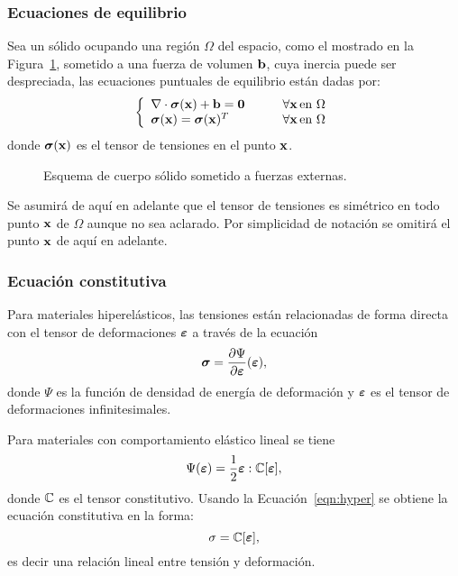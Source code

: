 \subsubsection*{Ecuaciones de equilibrio}

Sea un sólido ocupando una región $\Omega$ del espacio, como el mostrado en la Figura~\ref{fig:diagrama_solido}, sometido a una fuerza de volumen ${\bf b}$, cuya inercia puede ser despreciada, las ecuaciones puntuales de equilibrio están dadas por:
%
\begin{equation}\label{eqn:equil}
\left\{
\begin{array}{lr}
  \nabla \cdot \boldsymbol{\sigma}({\bf x}) + {\bf b} = \boldsymbol{0} \qquad &\forall {\bf x} \, \text{en } \Omega\\
  \boldsymbol{\sigma}({\bf x}) = \boldsymbol{\sigma}({\bf x})^T \qquad  &\forall {\bf x}\, \text{en } \Omega
\end{array}
\right.
\end{equation}
%
donde $\boldsymbol{\sigma}({\bf x})$ es el tensor de tensiones en el punto ${\bf x}$. %
%

\begin{figure}[htb]
\centering
  \def\svgwidth{0.4\textwidth}
  
\caption{Esquema de cuerpo sólido sometido a fuerzas externas.}
\label{fig:diagrama_solido}
\end{figure}

%
Se asumirá de aquí en adelante que el tensor de tensiones es simétrico en todo punto ${\bf x}$ de $\Omega$ aunque no sea aclarado. %
%
Por simplicidad de notación se omitirá el punto ${\bf x}$ de aquí en adelante. %

\subsubsection*{Ecuación constitutiva}

Para materiales hiperelásticos, las tensiones están relacionadas de forma directa con el tensor de deformaciones $\boldsymbol{\varepsilon}$ a través de la ecuación
%
\begin{equation}\label{eqn:hyper}
  \boldsymbol{\sigma} = \frac{\partial \Psi }{\partial \boldsymbol{\varepsilon}} (\boldsymbol{\varepsilon}),
\end{equation}
%
donde $\Psi$ es la función de densidad de energía de deformación y $\boldsymbol{\varepsilon}$ es el tensor de deformaciones infinitesimales.

Para materiales con comportamiento elástico lineal se tiene
%
\begin{equation}
\Psi (\boldsymbol{\varepsilon}) = \frac{1}{2} \boldsymbol{\varepsilon} : {\mathbb C}[  \boldsymbol{\varepsilon}],
\end{equation}
donde ${\mathbb C}$ es el tensor constitutivo. %
%
Usando la Ecuación~\eqref{eqn:hyper} se obtiene la ecuación constitutiva en la forma: %
%
\begin{equation}
  \sigma = {\mathbb C} [\boldsymbol{\varepsilon}],
\end{equation}
%
es decir una relación lineal entre tensión y deformación.


